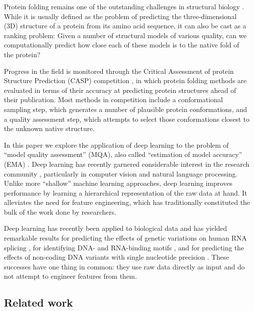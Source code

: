 
Protein folding remains one of the outstanding challenges in
structural biology \cite{dill2012folding}. While it is usually defined
as the problem of predicting the three-dimensional (3D) structure of a
protein from its amino acid sequence, it can also be cast as a ranking
problem: Given a number of structural models of various quality, can
we computationally predict how close each of these models is to the
native fold of the protein?

Progress in the field is monitored through the Critical Assessment of
protein Structure Prediction (CASP) competition \cite{moult1995large},
in which protein folding methods are evaluated in terms of their
accuracy at predicting protein structures ahead of their
publication. Most methods in competition include a conformational
sampling step, which generates a number of plausible protein
conformations, and a quality assessment step, which attempts to select
those conformations closest to the unknown native structure.

In this paper we explore the application of deep learning to the
problem of ``model quality assessment'' (MQA), also called
``estimation of model accuracy'' (EMA) \cite{kryshtafovych2015}. Deep
learning has recently garnered considerable interest in the research
community \cite{lecun2015deep}, particularly in computer vision and
natural language processing. Unlike more ``shallow'' machine learning
approaches, deep learning improves performance by learning a
hierarchical representation of the raw data at hand. It alleviates the
need for feature engineering, which has traditionally constituted the
bulk of the work done by researchers.

Deep learning has recently been applied to biological data and has
yielded remarkable results for predicting the effects of genetic
variations on human RNA splicing \cite{xiong2015human}, for
identifying DNA- and RNA-binding
motifs \cite{alipanahi2015predicting}, and for predicting the effects
of non-coding DNA variants with single nucleotide
precision \cite{zhou2015predicting}. These successes have one thing in
common: they use raw data directly as input and do not attempt to
engineer features from them.

\subsection{Related work}

